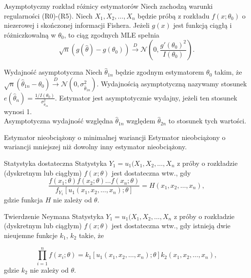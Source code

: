 \documentclass[avery5371, grid, frame]{flashcards}
\begin{document}
\begin{flashcard}[Twierdzenie]{Asymptotyczny rozkład różnicy estymatorów}
    Niech zachodzą warunki regularności (R0)-(R5). Niech $X_1, X_2, \dots, X_n$ będzie próbą z rozkładu $f(x; \theta_0)$ o niezerowej i skończonej informacji Fishera. Jeżeli $g(x)$ jest funkcją ciągłą i różniczkowalną w $\theta_0$, to ciąg zgodnych MLE spełnia
    $$\sqrt{n} (g(\hat{\theta}) - g(\theta_0)) \overset{D}{\rightarrow} \mathcal{N} \left( 0, \frac{g'(\theta_0)^2}{I(\theta_0)} \right). $$
\end{flashcard}

\begin{flashcard}[Definicja]{Wydajność asymptotyczna}
    Niech $\hat{\theta}_{1n}$ będzie zgodnym estymatorem $\theta_0$ takim, że $\sqrt{n}(\hat{\theta}_{1n} - \theta_0) \xrightarrow{D} \mathcal{N}(0, \sigma_{\hat{\theta}_{1n}}^2).$ Wydajnością asymptotyczną nazywamy stosunek $e(\hat{\theta}_{n}) = \frac{1/I(\theta_0)}{\sigma_{\hat{\theta}_{1n}}^2}$. Estymator jest asymptotycznie wydajny, jeżeli ten stosunek wynosi 1. \\
    Asymptotyczna wydajność względna $\hat{\theta}_{1n}$ względem $\hat{\theta}_{2n}$ to stosunek tych wartości.
    
\end{flashcard}

\begin{flashcard}[Definicja]{Estymator nieobciążony o minimalnej wariancji}
    Estymator nieobciążony o wariancji mniejszej niż dowolny inny estymator nieobciążony.
\end{flashcard}

\begin{flashcard}[Definicja]{Statystyka dostateczna}
    Statystyka $Y_1 = u_1(X_1, X_2, \dots, X_n$ z próby o rozkładzie (dyskretnym lub ciągłym) $f(x; \theta)$ jest dostateczna wtw., gdy
    $$ \frac{f(x_1; \theta) f(x_2; \theta) \dots f(x_n; \theta)}{f_{Y_1}[u_1(x_1, x_2, \dots, x_n); \theta]} = H(x_1, x_2, \dots, x_n),$$ gdzie funkcja $H$ nie zależy od $\theta$.
\end{flashcard}

\begin{flashcard}[Twierdzenie]{Twierdzenie Neymana}
    Statystyka $Y_1 = u_1(X_1, X_2, \dots, X_n$ z próby o rozkładzie (dyskretnym lub ciągłym) $f(x; \theta)$ jest dostateczna wtw., gdy istnieją dwie nieujemne funkcje $k_1$, $k_2$ takie, że
    \begin{small}
    $$ \prod_{i=1}^n f(x_i; \theta) = k_1[u_1(x_1, x_2, \dots, x_n); \theta] k_2(x_1, x_2, \dots, x_n), $$ gdzie $k_2$ nie zależy od $\theta$.
    \end{small}
\end{flashcard}
\end{document}
